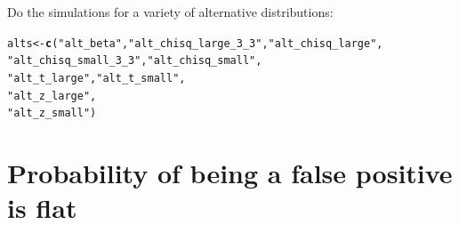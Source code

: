 \documentclass{article}\usepackage[]{graphicx}\usepackage[]{color}
\makeatletter
\newcommand{\hlstr}[1]{\textcolor[rgb]{0.192,0.494,0.8}{#1}}%
\newcommand{\hlstd}[1]{\textcolor[rgb]{0.345,0.345,0.345}{#1}}%
\newcommand{\hlkwb}[1]{\textcolor[rgb]{0.69,0.353,0.396}{#1}}%
\newcommand{\hlkwd}[1]{\textcolor[rgb]{0.737,0.353,0.396}{\textbf{#1}}}%
\newenvironment{kframe}{%
 \def\at@end@of@kframe{}%
 \ifinner\ifhmode%
  \def\at@end@of@kframe{\end{minipage}}%
  \begin{minipage}{\columnwidth}%
 \fi\fi%
 \def\FrameCommand##1{\hskip\@totalleftmargin \hskip-\fboxsep
 \colorbox{shadecolor}{##1}\hskip-\fboxsep
     \hskip-\linewidth \hskip-\@totalleftmargin \hskip\columnwidth}%
 \MakeFramed {\advance\hsize-\width
   \@totalleftmargin\z@ \linewidth\hsize
   \@setminipage}}%
 {\par\unskip\endMakeFramed%
 \at@end@of@kframe}
\newenvironment{knitrout}{}{} %
\makeatother
\begin{document}
Do the simulations for a variety of alternative distributions:
\begin{knitrout}
\color{fgcolor}\begin{kframe}
\begin{alltt}
\hlstd{alts} \hlkwb{<-} \hlkwd{c}\hlstd{(}\hlstr{"alt_beta"}\hlstd{,}\hlstr{"alt_chisq_large_3_3"}\hlstd{,}\hlstr{"alt_chisq_large"}\hlstd{,}
          \hlstr{"alt_chisq_small_3_3"}\hlstd{,}\hlstr{"alt_chisq_small"}\hlstd{,}
          \hlstr{"alt_t_large"}\hlstd{,}\hlstr{"alt_t_small"}\hlstd{,}
          \hlstr{"alt_z_large"}\hlstd{,}
          \hlstr{"alt_z_small"}\hlstd{)}
\end{alltt}
\end{kframe}
\end{knitrout}

\section{Probability of being a false positive is flat}
\end{document}
